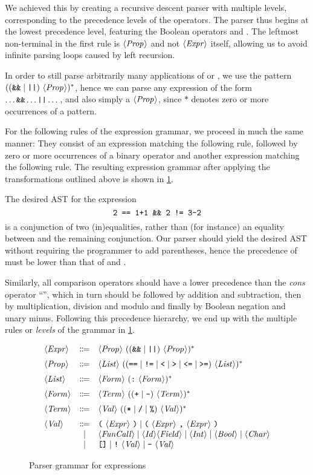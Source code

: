 We achieved this by creating a recursive descent parser with multiple levels,
corresponding to the precedence levels of the operators.
The parser thus begins at the lowest precedence level, featuring the Boolean
operators \code{\&\&} and \code{||}.
The leftmost non-terminal in the first rule is $\langle \textit{Prop}\kern.7pt \rangle$ and not $\langle \textit{Expr}\kern.7pt \rangle$
itself, allowing us to avoid infinite parsing loops caused by left recursion.

In order to still parse arbitrarily many applications of \code{\&\&} or
\code{||}, we use the pattern $((\texttt{\&\&} \mid \texttt{||})\ \langle \textit{Prop}\kern.7pt \rangle)^*$,
hence we can parse any expression of the form $\dots \texttt{\&\&} \dots \texttt{||} \dots$,
and also simply a $\langle \textit{Prop}\kern.7pt \rangle$, since $*$ denotes zero or more occurrences of
a pattern.

For the following rules of the expression grammar, we proceed in much the same
manner: They consist of an expression matching the following rule, followed
by zero or more occurrences of a binary operator and another expression matching
the following rule. The resulting expression grammar after applying the
transformations outlined above is shown in \cref{fig:new-expr-grammar}.

The desired AST for the expression
\[ \texttt{2 == 1+1 \&\& 2 != 3-2} \]
is a conjunction of two (in)equalities, rather than (for instance) an equality
between  and the remaining conjunction.
Our parser should yield the desired AST without requiring the programmer to add
parentheses, hence the precedence of \code{\&\&} must be lower than that of
\code{==} and \code{!=}.

Similarly, all comparison operators should have a lower precedence than the
\emph{cons} operator ``\code{:}'', which in turn should be followed by addition
and subtraction, then by multiplication, division and modulo and finally by
Boolean negation and unary minus.
Following this precedence hierarchy, we end up with the multiple rules or
\emph{levels} of the grammar in \cref{fig:new-expr-grammar}.


\begin{figure}[ht]
  \[
  \begin{array}{lcl}
		\NT{Expr} & \Coloneqq & \NT{Prop}\ ((\code{\&\&} \mid \code{||})\ \NT{Prop})^* \br
		\NT{Prop} & \Coloneqq & \NT{List}\ ((\code{==} \mid \code{!=} \mid \code{<} \mid \code{>} \mid \code{<=} \mid \code{>=})\ \NT{List})^* \br
		\NT{List} & \Coloneqq & \NT{Form}\ (\code{:}\ \NT{Form})^* \br
		\NT{Form} & \Coloneqq & \NT{Term}\ (( \code{+} \mid \code{-} )\ \NT{Term})^* \br
		\NT{Term} & \Coloneqq & \NT{Val}\ (( \code{*} \mid \code{/} \mid \code{\%} )\ \NT{Val} )^* \br
		\NT{Val} & \Coloneqq & \code{(}\ \NT{Expr}\ \code{)} \mid \code{(}\ \NT{Expr}\ \code{,}\ \NT{Expr}\ \code{)} \\
		& \mid & \NT{FunCall} \mid \NT{Id} \NT{Field} \mid \NT{Int} \mid \NT{Bool} \mid \NT{Char} \\
		& \mid & \code{[]} \mid \code{!}\ \NT{Val} \mid \code{-}\ \NT{Val}
  \end{array}
  \]
  \caption{Parser grammar for expressions}
  \label{fig:new-expr-grammar}
\end{figure}


